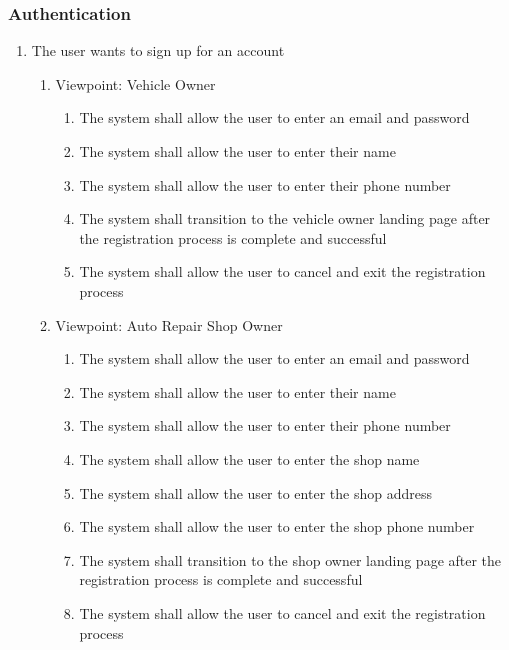 \documentclass[12pt]{article}
\begin{document}
\subsubsection{Authentication}
\begin{enumerate}[label=BE\arabic*., series=business_events]
	\item The user wants to sign up for an account
	      \begin{enumerate}[VP\arabic*.]
		      \item Viewpoint: Vehicle Owner
		            \begin{enumerate}
			            \item The system shall allow the user to enter an email and password
			            \item The system shall allow the user to enter their name
			            \item The system shall allow the user to enter their phone number
			            \item The system shall transition to the vehicle owner landing page after the registration process is
			                  complete and successful
			            \item The system shall allow the user to cancel and exit the registration process
		            \end{enumerate}

		      \item Viewpoint: Auto Repair Shop Owner
		            \begin{enumerate}
			            \item The system shall allow the user to enter an email and password
			            \item The system shall allow the user to enter their name
			            \item The system shall allow the user to enter their phone number
			            \item The system shall allow the user to enter the shop name
			            \item The system shall allow the user to enter the shop address
			            \item The system shall allow the user to enter the shop phone number
			            \item The system shall transition to the shop owner landing page after the registration process is
			                  complete and successful
			            \item The system shall allow the user to cancel and exit the registration process
		            \end{enumerate}


\end{enumerate}
\end{enumerate}
\end{document}
